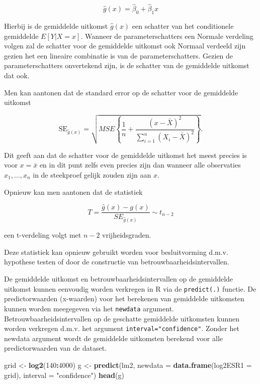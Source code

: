 \documentclass[
  12pt,dutch,coursenotes]{book}
\newenvironment{Shaded}{\begin{snugshade}}{\end{snugshade}}
\newcommand{\DataTypeTok}[1]{\textcolor[rgb]{0.13,0.29,0.53}{#1}}
\newcommand{\DecValTok}[1]{\textcolor[rgb]{0.00,0.00,0.81}{#1}}
\newcommand{\KeywordTok}[1]{\textcolor[rgb]{0.13,0.29,0.53}{\textbf{#1}}}
\newcommand{\NormalTok}[1]{#1}
\newcommand{\OperatorTok}[1]{\textcolor[rgb]{0.81,0.36,0.00}{\textbf{#1}}}
\newcommand{\StringTok}[1]{\textcolor[rgb]{0.31,0.60,0.02}{#1}}
\theoremstyle{definition}
\theoremstyle{definition}
\theoremstyle{definition}
\theoremstyle{remark}
\begin{document}
\[\hat{g}(x)= \hat{\beta}_0 + \hat{\beta}_1 x\]

Hierbij is de gemiddelde uitkomst \(\hat{g}(x)\) een schatter van het conditionele gemiddelde \(E[Y\vert X=x]\).
Wanneer de parameterschatters een Normale verdeling volgen zal de schatter voor de gemiddelde uitkomst ook Normaal verdeeld zijn gezien het een lineaire combinatie is van de parameterschatters.
Gezien de parameterschatters onvertekend zijn, is de schatter van de gemiddelde uitkomst dat ook.

Men kan aantonen dat de standard error op de schatter voor de gemiddelde uitkomst

\[\text{SE}_{\hat{g}(x)}=\sqrt{MSE\left\{\frac{1}{n}+\frac{(x-\bar X)^2}{\sum\limits_{i=1}^n (X_i-\bar X)^2}\right\}}.\]

Dit geeft aan dat de schatter voor de gemiddelde uitkomst het meest precies is voor \(x=\bar x\) en in dit punt zelfs even precies zijn dan wanneer alle observaties \(x_1,\ldots, x_n\) in de steekproef gelijk zouden zijn aan \(x\).

Opnieuw kan men aantonen dat de statistiek

\[T=\frac{\hat{g}(x)-g(x)}{SE_{\hat{g}(x)}}\sim t_{n-2}\]

een t-verdeling volgt met \(n-2\) vrijheidsgraden.

Deze statistiek kan opnieuw gebruikt worden voor besluitvorming d.m.v. hypothese testen of door de constructie van betrouwbaarheidsintervallen.

De gemiddelde uitkomst en betrouwbaarheidsintervallen op de gemiddelde uitkomst kunnen eenvoudig worden verkregen in R via de \texttt{predict(.)} functie.
De predictorwaarden (x-waarden) voor het berekenen van gemiddelde uitkomsten kunnen worden meegegeven via het \texttt{newdata} argument.
Betrouwbaarheidsintervallen op de geschatte gemiddelde uitkomsten kunnen worden verkregen d.m.v. het argument \texttt{interval="confidence"}.
Zonder het newdata argument wordt de gemiddelde uitkomsten berekend voor alle predictorwaarden van de dataset.

\begin{Shaded}
\begin{Highlighting}[]
\NormalTok{grid \textless{}{-}}\StringTok{ }\KeywordTok{log2}\NormalTok{(}\DecValTok{140}\OperatorTok{:}\DecValTok{4000}\NormalTok{)}
\NormalTok{g \textless{}{-}}\StringTok{ }\KeywordTok{predict}\NormalTok{(lm2, }\DataTypeTok{newdata =} \KeywordTok{data.frame}\NormalTok{(}\DataTypeTok{log2ESR1 =}\NormalTok{ grid), }
    \DataTypeTok{interval =} \StringTok{"confidence"}\NormalTok{)}
\KeywordTok{head}\NormalTok{(g)}
\end{Highlighting}
\end{Shaded}
\end{document}
